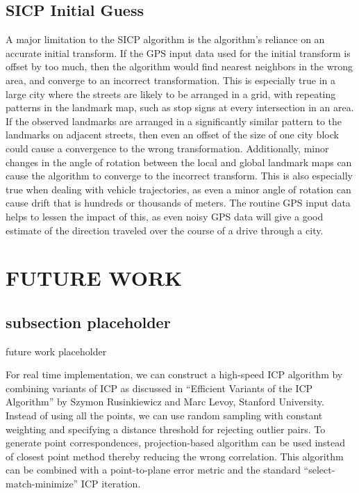\documentclass[letterpaper, 10 pt, conference]{ieeeconf}  %
\begin{document}
\subsection{SICP Initial Guess}

A major limitation to the SICP algorithm is the algorithm's reliance on an accurate initial transform. If the GPS input data used for the initial transform is offset by too much, then the algorithm would find nearest neighbors in the wrong area, and converge to an incorrect transformation. This is especially true in a large city where the streets are likely to be arranged in a grid, with repeating patterns in the landmark map, such as stop signs at every intersection in an area. If the observed landmarks are arranged in a significantly similar pattern to the landmarks on adjacent streets, then even an offset of the size of one city block could cause a convergence to the wrong transformation. Additionally, minor changes in the angle of rotation between the local and global landmark maps can cause the algorithm to converge to the incorrect transform. This is also especially true when dealing with vehicle trajectories, as even a minor angle of rotation can cause drift that is hundreds or thousands of meters. The routine GPS input data helps to lessen the impact of this, as even noisy GPS data will give a good estimate of the direction traveled over the course of a drive through a city. 

\section{FUTURE WORK}

\subsection{subsection placeholder}

future work placeholder


For real time implementation, we can construct a high-speed ICP algorithm by combining variants of ICP as discussed in “Efficient Variants of the ICP Algorithm” by Szymon Rusinkiewicz and Marc Levoy, Stanford University. Instead of using all the points, we can use random sampling with constant weighting and specifying a distance threshold for rejecting outlier pairs. To generate point correspondences, projection-based algorithm can be used instead of closest point method thereby reducing the wrong correlation. This algorithm can be combined with a point-to-plane error metric and the standard “select-match-minimize” ICP iteration. 
\end{document}
